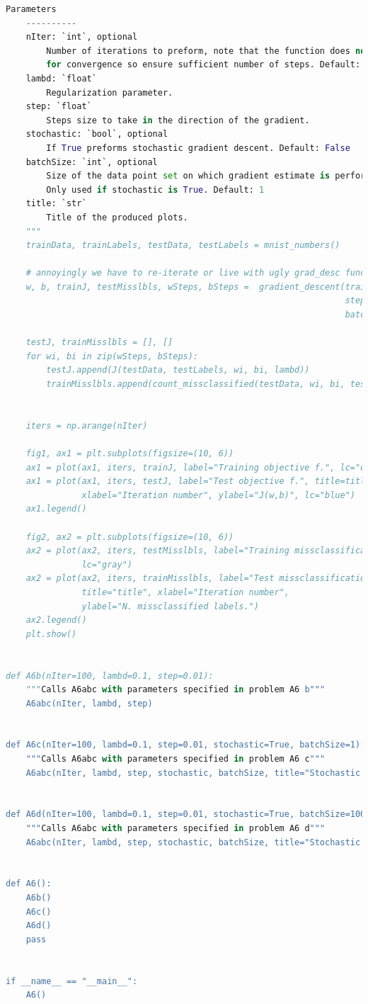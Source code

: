 \documentclass{article}
\newcommand{\1}{\mathbf{1}}
\begin{document}
\begin{lstlisting}[language=Python]
    Parameters
    ----------
    nIter: `int`, optional
        Number of iterations to preform, note that the function does not test
        for convergence so ensure sufficient number of steps. Default: 10
    lambd: `float`
        Regularization parameter.
    step: `float`
        Steps size to take in the direction of the gradient.
    stochastic: `bool`, optional
        If True preforms stochastic gradient descent. Default: False
    batchSize: `int`, optional
        Size of the data point set on which gradient estimate is performed on.
        Only used if stochastic is True. Default: 1
    title: `str`
        Title of the produced plots.
    """
    trainData, trainLabels, testData, testLabels = mnist_numbers()

    # annoyingly we have to re-iterate or live with ugly grad_desc func.
    w, b, trainJ, testMisslbls, wSteps, bSteps =  gradient_descent(trainData, trainLabels, lambd,
                                                                   step, nIter=nIter, stochastic=stochastic,
                                                                   batchSize=batchSize)

    testJ, trainMisslbls = [], []
    for wi, bi in zip(wSteps, bSteps):
        testJ.append(J(testData, testLabels, wi, bi, lambd))
        trainMisslbls.append(count_missclassified(testData, wi, bi, testLabels))


    iters = np.arange(nIter)

    fig1, ax1 = plt.subplots(figsize=(10, 6))
    ax1 = plot(ax1, iters, trainJ, label="Training objective f.", lc="orange")
    ax1 = plot(ax1, iters, testJ, label="Test objective f.", title=title,
               xlabel="Iteration number", ylabel="J(w,b)", lc="blue")
    ax1.legend()

    fig2, ax2 = plt.subplots(figsize=(10, 6))
    ax2 = plot(ax2, iters, testMisslbls, label="Training missclassifications.",
               lc="gray")
    ax2 = plot(ax2, iters, trainMisslbls, label="Test missclassifications.",
               title="title", xlabel="Iteration number",
               ylabel="N. missclassified labels.")
    ax2.legend()
    plt.show()


def A6b(nIter=100, lambd=0.1, step=0.01):
    """Calls A6abc with parameters specified in problem A6 b"""
    A6abc(nIter, lambd, step)


def A6c(nIter=100, lambd=0.1, step=0.01, stochastic=True, batchSize=1):
    """Calls A6abc with parameters specified in problem A6 c"""
    A6abc(nIter, lambd, step, stochastic, batchSize, title="Stochastic Gradient Descent.")


def A6d(nIter=100, lambd=0.1, step=0.01, stochastic=True, batchSize=100):
    """Calls A6abc with parameters specified in problem A6 d"""
    A6abc(nIter, lambd, step, stochastic, batchSize, title="Stochastic Gradient Descent.")


def A6():
    A6b()
    A6c()
    A6d()
    pass
    
    
if __name__ == "__main__":
    A6()

\end{lstlisting}
\end{document}
